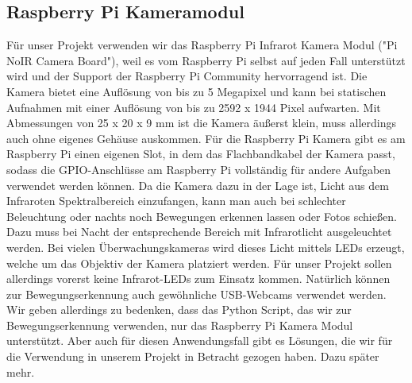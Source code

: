 \documentclass[journal]{IEEEtran}
\begin{document}
\subsection{Raspberry Pi Kameramodul}
Für unser Projekt verwenden wir das Raspberry Pi Infrarot Kamera Modul ("Pi NoIR Camera Board"), weil es vom Raspberry Pi selbst auf jeden Fall unterstützt wird und der Support der Raspberry Pi Community hervorragend ist. Die Kamera bietet eine Auflösung von bis zu 5 Megapixel und kann bei statischen Aufnahmen mit einer Auflösung von bis zu 2592 x 1944 Pixel aufwarten. Mit Abmessungen von 25 x 20 x 9 mm ist die Kamera äußerst klein, muss allerdings auch ohne eigenes Gehäuse auskommen. Für die Raspberry Pi Kamera gibt es am Raspberry Pi einen eigenen Slot, in dem das Flachbandkabel der Kamera passt, sodass die GPIO-Anschlüsse am Raspberry Pi vollständig für andere Aufgaben verwendet werden können. Da die Kamera dazu in der Lage ist, Licht aus dem Infraroten Spektralbereich einzufangen, kann man auch bei schlechter Beleuchtung oder nachts noch Bewegungen erkennen lassen oder Fotos schießen. Dazu muss bei Nacht der entsprechende Bereich mit Infrarotlicht ausgeleuchtet werden. Bei vielen Überwachungskameras wird dieses Licht mittels LEDs erzeugt, welche um das Objektiv der Kamera platziert werden. Für unser Projekt sollen allerdings vorerst keine Infrarot-LEDs zum Einsatz kommen. Natürlich können zur Bewegungserkennung auch gewöhnliche USB-Webcams verwendet werden. Wir geben allerdings zu bedenken, dass das Python Script, das wir zur Bewegungserkennung verwenden, nur das Raspberry Pi Kamera Modul unterstützt. Aber auch für diesen Anwendungsfall gibt es Lösungen, die wir für die Verwendung in unserem Projekt in Betracht gezogen haben. Dazu später mehr.
\end{document}
